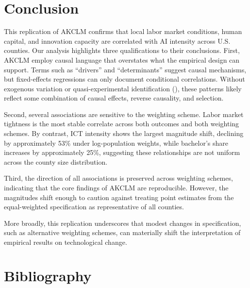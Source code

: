\documentclass[
]{article}
\begin{document}
\section{Conclusion}\label{conclusion}

This replication of AKCLM confirms that local labor market conditions,
human capital, and innovation capacity are correlated with AI intensity
across U.S. counties. Our analysis highlights three qualifications to
their conclusions. First, AKCLM employ causal language that overstates
what the empirical design can support. Terms such as ``drivers'' and
``determinants'' suggest causal mechanisms, but fixed-effects
regressions can only document conditional correlations. Without
exogenous variation or quasi-experimental identification
(), these patterns likely
reflect some combination of causal effects, reverse causality, and
selection.

Second, several associations are sensitive to the weighting scheme.
Labor market tightness is the most stable correlate across both outcomes
and both weighting schemes. By contrast, ICT intensity shows the largest
magnitude shift, declining by approximately 53\% under log-population
weights, while bachelor's share increases by approximately 25\%,
suggesting these relationships are not uniform across the county size
distribution.

Third, the direction of all associations is preserved across weighting
schemes, indicating that the core findings of AKCLM are reproducible.
However, the magnitudes shift enough to caution against treating point
estimates from the equal-weighted specification as representative of all
counties.

More broadly, this replication underscores that modest changes in
specification, such as alternative weighting schemes, can materially
shift the interpretation of empirical results on technological change.

\section*{Bibliography}\label{bibliography}
\end{document}
